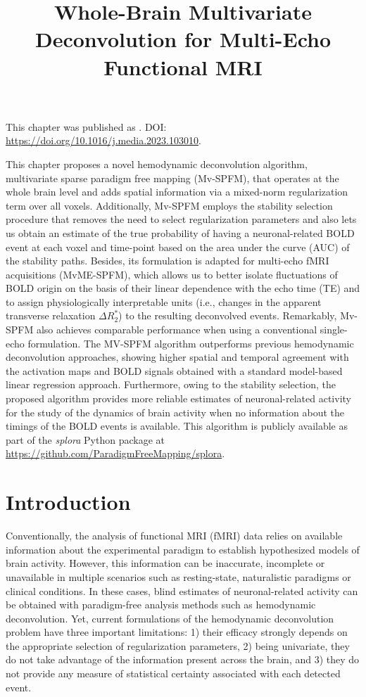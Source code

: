 \title{Whole-Brain Multivariate Deconvolution for Multi-Echo Functional MRI}
\label{cha:multivariate}

\begin{framed}\noindent This chapter was published as
    . DOI:
    \url{https://doi.org/10.1016/j.media.2023.103010}.
\end{framed}

This chapter proposes a novel hemodynamic deconvolution algorithm, multivariate
sparse paradigm free mapping (Mv-SPFM), that operates at the whole brain level
and adds spatial information via a mixed-norm regularization term over all
voxels. Additionally, Mv-SPFM employs the stability selection
procedure that removes the need to select regularization parameters and also
lets us obtain an estimate of the true probability of having a neuronal-related
BOLD event at each voxel and time-point based on the area under the curve (AUC)
of the stability paths. Besides, its formulation is adapted for multi-echo fMRI
acquisitions (MvME-SPFM), which allows us to better isolate fluctuations of BOLD
origin on the basis of their linear dependence with the echo time (TE) and to
assign physiologically interpretable units (i.e., changes in the apparent
transverse relaxation $\Delta R_2^*$) to the resulting deconvolved events.
Remarkably, Mv-SPFM also achieves comparable performance when using a
conventional single-echo formulation. The MV-SPFM algorithm outperforms previous
hemodynamic deconvolution approaches, showing higher spatial and temporal
agreement with the activation maps and BOLD signals obtained with a standard
model-based linear regression approach. Furthermore, owing to the stability
selection, the proposed algorithm provides more reliable estimates of
neuronal-related activity for the study of the dynamics of brain activity when
no information about the timings of the BOLD events is available. This algorithm
is publicly available as part of the \textit{splora} Python package at
\url{https://github.com/ParadigmFreeMapping/splora}.

\section{Introduction}
\label{sec:multivariate_introduction}

Conventionally, the analysis of functional MRI (fMRI) data relies on available
information about the experimental paradigm to establish hypothesized models of
brain activity. However, this information can be inaccurate, incomplete or
unavailable in multiple scenarios such as resting-state, naturalistic paradigms
or clinical conditions. In these cases, blind estimates of neuronal-related
activity can be obtained with paradigm-free analysis methods such as hemodynamic
deconvolution. Yet, current formulations of the hemodynamic deconvolution
problem have three important limitations: 1) their efficacy strongly depends on
the appropriate selection of regularization parameters, 2) being univariate,
they do not take advantage of the information present across the brain, and 3)
they do not provide any measure of statistical certainty associated with each
detected event.

